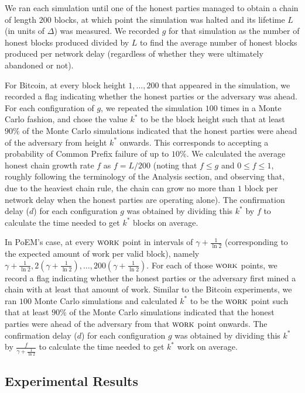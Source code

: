 We ran each simulation until one of the honest parties managed to obtain a chain of
length $200$ blocks, at which point the simulation was halted and its lifetime $L$
(in units of $\Delta$) was measured. We recorded $g$ for that simulation as the number
of honest blocks produced divided by $L$ to find the average number of honest blocks
produced per network delay (regardless of whether they were ultimately abandoned or not).

For Bitcoin, at every block height
$1, \ldots, 200$ that appeared in the simulation, we recorded a flag indicating whether
the honest parties or the adversary was ahead. For each configuration of $g$, we
repeated the simulation $100$ times in a Monte Carlo fashion, and chose the value
$k^*$ to be the block height such that at least $90\%$ of the Monte Carlo simulations
indicated that the honest parties were ahead of the adversary from height $k^*$
onwards. This corresponds to accepting a probability of Common Prefix failure of
up to $10\%$.
We calculated the average honest chain growth rate $f$ as $f = L / 200$
(noting that $f \leq g$ and $0 \leq f \leq 1$, roughly following the terminology
of the Analysis section, and observing that, due to the heaviest chain rule,
the chain can grow no more than $1$ block per network delay when the honest
parties are operating alone).
The confirmation delay ($d$) for each configuration $g$ was obtained by dividing
this $k^*$ by $f$ to calculate the time needed to get $k^*$ blocks on average.

In PoEM's case, at every $\textsc{work}$ point in intervals of $\gamma + \frac{1}{\ln2}$
(corresponding to the expected amount of work per valid block),
namely $\gamma + \frac{1}{\ln2}, 2\left(\gamma + \frac{1}{\ln2}\right),\allowbreak\ldots,\allowbreak 200\left(\gamma + \frac{1}{\ln2}\right)$.
For each of those $\textsc{work}$ points, we record a flag indicating whether the honest
parties or the adversary first mined a chain with at least that amount of work.
Similar to the Bitcoin experiments, we ran $100$ Monte Carlo simulations and
calculated $k^*$ to be the $\textsc{work}$ point such that at least $90\%$ of the
Monte Carlo simulations indicated that the honest parties were ahead of the
adversary from that $\textsc{work}$ point onwards. The confirmation delay ($d$) for
each configuration $g$ was obtained by dividing this $k^*$ by $\frac{f}{\gamma + \frac{1}{\ln2}}$
to calculate the time needed to get $k^*$ work on average.

\subsection{Experimental Results}\label{sec:results}

